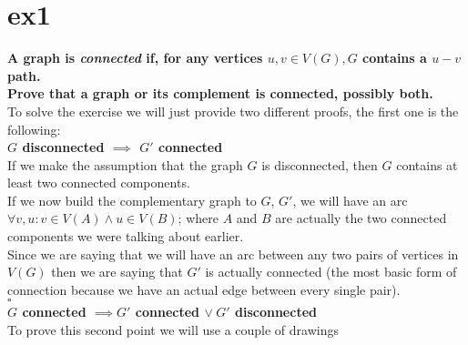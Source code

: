 \section{ex1}
\boldmath
\textbf{A graph is \textit{connected} if, for any vertices $u, v \in V(G), G$ contains a $u - v$ path.\\
Prove that a graph or its complement is connected, possibly both.}\vspace{10pt}\\
\unboldmath
To solve the exercise we will just provide two different proofs, the first one is the following:\vspace{5pt}\\
\boldmath
\textbf{$G$ disconnected $\implies$ $G'$ connected}\vspace{5pt}\\
\unboldmath
If we make the assumption that the graph $G$ is disconnected, then $G$ contains at least two connected components.\\
If we now build the complementary graph to $G$, $G'$, we will have an arc $\forall v, u : v \in V(A) \land u \in V(B)$; where $A$ and $B$ are actually the two connected components we were talking about earlier.\\
Since we are saying that we will have an arc between any two pairs of vertices in $V(G)$ then we are saying that $G'$ is actually connected (the most basic form of connection because we have an actual edge between every single pair).
\vspace{2pt}\\\hspace*{3cm}$\square$\vspace*{10pt}\\
\boldmath
\textbf{$G$ connected $\implies G'$ connected $\vee\hspace{3pt} G'$ disconnected}\vspace{5pt}\\
\unboldmath
To prove this second point we will use a couple of drawings\\
\begin{center}
\hspace*{3cm}
\end{center}
